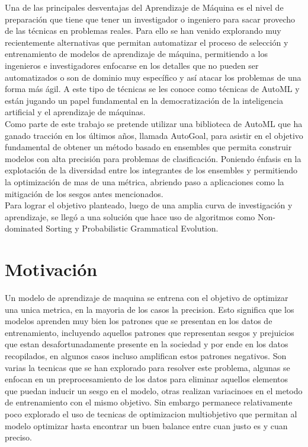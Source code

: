 Una de las principales desventajas del Aprendizaje de Máquina es el nivel de preparación que tiene que
tener un investigador o ingeniero para sacar provecho de las técnicas en problemas reales.
Para ello se han venido explorando muy recientemente alternativas que permitan
automatizar el proceso de selección y entrenamiento de modelos de aprendizaje de máquina,
permitiendo a los ingenieros e investigadores enfocarse en los detalles que no pueden ser
automatizados o son de dominio muy específico y así atacar los problemas de una forma más
ágil. A este tipo de técnicas se les conoce como técnicas de AutoML y están jugando un
papel fundamental en la democratización de la inteligencia artificial y el aprendizaje de
máquinas.\\
Como parte de este trabajo se pretende utilizar una biblioteca de AutoML que ha ganado
tracción en los últimos años, llamada AutoGoal, para asistir en el objetivo fundamental de
obtener un método basado en ensembles que permita construir modelos con alta precisión
para problemas de clasificación. Poniendo énfasis en la explotación de la diversidad entre los
integrantes de los ensembles y permitiendo la optimización de mas de una métrica, abriendo
paso a aplicaciones como la mitigación de los sesgos antes mencionados.\\
Para lograr el objetivo planteado, luego de una amplia curva de investigación y aprendizaje, se llegó a una solución que hace uso de algoritmos como Non-dominated Sorting y Probabilistic Grammatical Evolution.

\section*{Motivación}

Un modelo de aprendizaje de maquina se entrena con el objetivo de optimizar una unica metrica, en la mayoria de los casos la precision. Esto significa que los modelos aprenden muy bien los patrones que se presentan en los datos de entrenamiento, incluyendo aquellos patrones que representan sesgos y prejuicios que estan desafortunadamente presente en la sociedad y por ende en los datos recopilados, en algunos casos incluso amplifican estos patrones negativos. Son varias la tecnicas que se han explorado para resolver este problema, algunas se enfocan en un preprocesamiento de los datos para eliminar aquellos elementos que puedan inducir un sesgo en el modelo, otras realizan variacinoes en el metodo de entrenamiento con el mismo objetivo. Sin embargo permanece relativamente poco explorado el uso de tecnicas de optimizacion multiobjetivo que permitan al modelo optimizar hasta encontrar un buen balance entre cuan justo es y cuan preciso.

